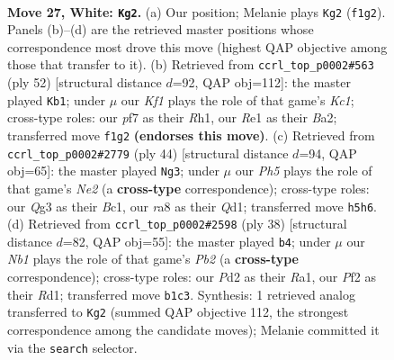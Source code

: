 \documentclass[11pt]{article}
\begin{document}
\clearpage

\begin{figure}[p]\centering
\begin{subfigure}{0.46\textwidth}\centering
\resizebox{\linewidth}{!}{%
\newchessgame
\chessboard[
  setfen={r3r2k/bp1b1pp1/pq2p3/3n3P/3p4/BP4QB/P2P1P1P/RN2RK2 w - - 5 27},
  showmover=false,
  pgfstyle=straightmove, color=movearrow, markmove={f1-g2}
]}
\caption{}
\end{subfigure}\hfill
\begin{subfigure}{0.46\textwidth}\centering
\resizebox{\linewidth}{!}{%
\newchessgame
\chessboard[
  setfen={2bq1rk1/5p2/pr1p2p1/p6p/4PPnP/2NQ2P1/BP1R4/2K4R w - - 2 27},
  showmover=false,
  pgfstyle=straightmove, color=movearrow, markmove={c1-b1}
]}
\caption{}
\end{subfigure}
\\[4pt]
\begin{subfigure}{0.46\textwidth}\centering
\resizebox{\linewidth}{!}{%
\newchessgame
\chessboard[
  setfen={r3qrk1/p5bp/3p1p2/1bpP1Pp1/2n1P3/5R2/1PB1N1PP/R1BQ2K1 w - - 0 23},
  showmover=false,
  pgfstyle=straightmove, color=movearrow, markmove={e2-g3}
]}
\caption{}
\end{subfigure}\hfill
\begin{subfigure}{0.46\textwidth}\centering
\resizebox{\linewidth}{!}{%
\newchessgame
\chessboard[
  setfen={r3r2k/1bq2pp1/p1pb1n1p/1p6/3P4/P2B1N1P/1PQB1PP1/R2R2K1 w - - 0 20},
  showmover=false,
  pgfstyle=straightmove, color=movearrow, markmove={b2-b4}
]}
\caption{}
\end{subfigure}
\caption{\textbf{Move 27, White: \texttt{Kg2}.} (a) Our position; Melanie plays \texttt{Kg2} (\texttt{f1g2}). Panels (b)--(d) are the retrieved master positions whose correspondence most drove this move (highest QAP objective among those that transfer to it). (b) Retrieved from \texttt{ccrl\_top\_p0002\#563} (ply 52) [structural distance $d$=92, QAP obj=112]: the master played \texttt{Kb1}; under $\mu$ our \emph{Kf1} plays the role of that game's \emph{Kc1}; cross-type roles: our \emph{p}f7 as their \emph{R}h1, our \emph{R}e1 as their \emph{B}a2; transferred move \texttt{f1g2} \textbf{(endorses this move)}. (c) Retrieved from \texttt{ccrl\_top\_p0002\#2779} (ply 44) [structural distance $d$=94, QAP obj=65]: the master played \texttt{Ng3}; under $\mu$ our \emph{Ph5} plays the role of that game's \emph{Ne2} (a \textbf{cross-type} correspondence); cross-type roles: our \emph{Q}g3 as their \emph{B}c1, our \emph{r}a8 as their \emph{Q}d1; transferred move \texttt{h5h6}. (d) Retrieved from \texttt{ccrl\_top\_p0002\#2598} (ply 38) [structural distance $d$=82, QAP obj=55]: the master played \texttt{b4}; under $\mu$ our \emph{Nb1} plays the role of that game's \emph{Pb2} (a \textbf{cross-type} correspondence); cross-type roles: our \emph{P}d2 as their \emph{R}a1, our \emph{P}f2 as their \emph{R}d1; transferred move \texttt{b1c3}. Synthesis: 1 retrieved analog transferred to \texttt{Kg2} (summed QAP objective 112, the strongest correspondence among the candidate moves); Melanie committed it via the \texttt{search} selector.}
\label{fig:thought-m52}
\end{figure}
\end{document}
